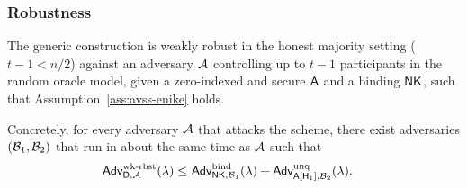 \subsubsection{Robustness}

\begin{theorem} \label{thm:perfect-robust}
  The generic construction is weakly robust in the honest majority setting
  ($t-1 < n/2$) against
  an adversary $\mathcal{A}$ controlling up to $t-1$ participants in the random oracle model,
  given a zero-indexed and secure \AVSS $\mathsf{A}$
  and a binding \ENIKE $\mathsf{NK}$,
  such that Assumption~\ref{ass:avss-enike} holds.

  Concretely, for every adversary $\mathcal{A}$ that attacks the scheme,
  there exist adversaries $(\mathcal{B}_1, \mathcal{B}_2)$ that run in about the same time as $\mathcal{A}$ such that
  \begin{align} \label{eq:wk-rbt-thm}
       \advantwkrobust{\dkg,\adv}(\lambda) \leq & \ \advant{bind}{\enike,\bdv_1}(\lambda) +
       \advantuniqueness{\avss[\Hash_1],\bdv_2}(\lambda).
    \end{align}
\end{theorem}

